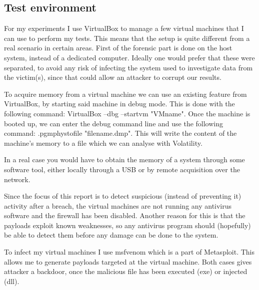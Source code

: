 \documentclass[a4paper]{article}
\begin{document}
\subsection{Test environment}


For my experiments I use VirtualBox to manage a few virtual machines that I can use to perform my tests. 
This means that the setup is quite different from a real scenario in certain areas. First of the forensic part is done on the host system, instead of a dedicated computer. Ideally one would prefer that these were separated, 
to avoid any risk of infecting the system used to investigate data from the victim(s), since that could allow an attacker to corrupt our results.

To acquire memory from a virtual machine we can use an existing feature from VirtualBox, by starting said machine in debug mode.
This is done with the following command: VirtualBox --dbg --startvm "VMname". %
Once the machine is booted up, we can enter the debug command line and use the following command: .pgmphystofile "filename.dmp".
This will write the content of the machine's memory to a file which we can analyse with Volatility.

In a real case you would have to obtain the memory of a system through some software tool, either locally through a USB or by remote acquisition over the network.

Since the focus of this report is to detect suspicious (instead of preventing it) activity after a breach, the virtual machines are not running any antivirus software and the firewall has been disabled. 
Another reason for this is that the payloads exploit known weaknesses, so any antivirus program should (hopefully) be able to detect them before any damage can be done to the system.


To infect my virtual machines I use msfvenom which is a part of Metasploit. This allows me to generate payloads targeted at the virtual machine.
Both cases gives attacker a backdoor, once the malicious file has been executed (exe) or injected (dll).
\end{document}
